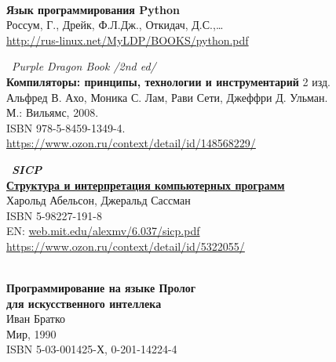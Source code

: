 \begin{thebibliography}{99}

\clearpage
{}\ \\
\textbf{Язык программирования Python}\\
Россум, Г., Дрейк, Ф.Л.Дж., Откидач, Д.С.,\ldots\\
\url{http://rus-linux.net/MyLDP/BOOKS/python.pdf}

\clearpage
{} \ \emph{Purple Dragon Book /2nd ed/}\\
\textbf{Компиляторы: принципы, технологии и инструментарий} 2 изд.\\
Альфред В. Ахо, Моника С. Лам, Рави Сети, Джеффри Д. Ульман.\\
М.: Вильямс, 2008.\\ ISBN 978-5-8459-1349-4.\\
\url{https://www.ozon.ru/context/detail/id/148568229/}

\clearpage
{} \ \textbf{\emph{SICP}\\
\href{https://drive.google.com/file/d/0B0u4WeMjO894X3lnWmhjUktKRk0/view?usp=sharing}{Структура
и интерпретация компьютерных программ}}\\
Харольд Абельсон, Джеральд Сассман\\
ISBN 5-98227-191-8\\
EN: \url{web.mit.edu/alexmv/6.037/sicp.pdf}\\
\url{https://www.ozon.ru/context/detail/id/5322055/}

\clearpage
{}\ \\
\textbf{Программирование на языке Пролог\\для искусственного интеллека}\\
Иван Братко\\
Мир, 1990\\ ISBN 5-03-001425-Х, 0-201-14224-4

\end{thebibliography}
